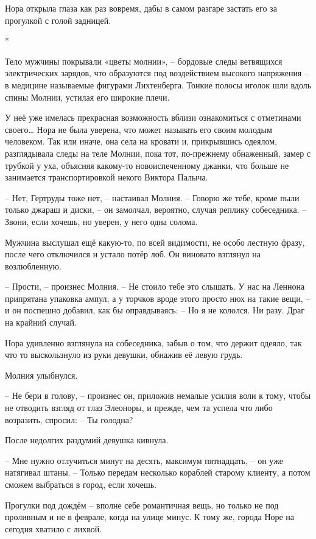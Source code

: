 \documentclass[
  a5paperpaper,
  DIV=11,
  numbers=noendperiod]{scrreprt}
\begin{document}
Нора открыла глаза как раз вовремя, дабы в самом разгаре застать его за
прогулкой с голой задницей.

*

Тело мужчины покрывали «цветы молнии», -- бордовые следы ветвящихся
электрических зарядов, что образуются под воздействием высокого
напряжения -- в медицине называемые фигурами Лихтенберга. Тонкие полосы
иголок шли вдоль спины Молнии, устилая его широкие плечи.

У неё уже имелась прекрасная возможность вблизи ознакомиться с
отметинами своего\ldots{} Нора не была уверена, что может называть его
своим молодым человеком. Так или иначе, она села на кровати и,
прикрывшись одеялом, разглядывала следы на теле Молнии, пока тот,
по-прежнему обнаженный, замер с трубкой у уха, объясняя какому-то
новоиспеченному джанки, что больше не занимается транспортировкой некого
Виктора Палыча.

-- Нет, Гертруды тоже нет, -- настаивал Молния. -- Говорю же тебе, кроме
пыли только джараш и диски, -- он замолчал, вероятно, случая реплику
собеседника. -- Звони, если хочешь, но уверен, у него одна солома.

Мужчина выслушал ещё какую-то, по всей видимости, не особо лестную
фразу, после чего отключился и устало потёр лоб. Он виновато взглянул на
возлюбленную.

-- Прости, -- произнес Молния. -- Не стоило тебе это слышать. У нас на
Леннона припрятана упаковка ампул, а у торчков вроде этого просто нюх на
такие вещи, -- и он поспешно добавил, как бы оправдываясь: -- Но я не
кололся. Ни разу. Драг на крайний случай.

Нора удивленно взглянула на собеседника, забыв о том, что держит одеяло,
так что то выскользнуло из руки девушки, обнажив её левую грудь.

Молния улыбнулся.

-- Не бери в голову, -- произнес он, приложив немалые усилия воли к
тому, чтобы не отводить взгляд от глаз Элеоноры, и прежде, чем та успела
что либо возразить, спросил: -- Ты голодна?

После недолгих раздумий девушка кивнула.

-- Мне нужно отлучиться минут на десять, максимум пятнадцать, -- он уже
натягивал штаны. -- Только передам несколько кораблей старому клиенту, а
потом сможем выбраться в город, если хочешь.

Прогулки под дождём -- вполне себе романтичная вещь, но только не под
проливным и не в феврале, когда на улице минус. К тому же, города Норе
на сегодня хватило с лихвой.
\end{document}
